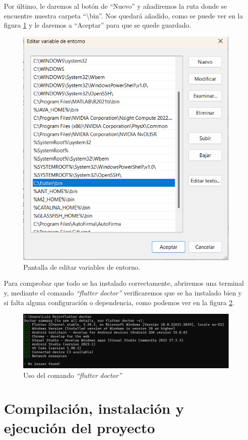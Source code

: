 Por último, le daremos al botón de ``Nuevo'' y añadiremos la ruta donde se encuentre nuestra carpeta ``\textbackslash bin''. Nos quedará añadido, como se puede ver en la figura \ref{C10} y le daremos a ``Aceptar'' para que se quede guardado.

\begin{figure}[H]
    \centering
    \includegraphics[width=0.8\linewidth]{Variables_Entorno_3.png}
    \caption{Pantalla de editar variables de entorno.}
    \label{C10}
\end{figure}

Para comprobar que todo se ha instalado correctamente, abriremos una terminal y, mediante el comando \textit{``flutter doctor''} verificaremos que se ha instalado bien y si falta alguna configuración o dependencia, como podemos ver en la figura \ref{C11}.

\begin{figure}[H]
    \centering
    \includegraphics[width=0.8\linewidth]{Comando_flutterdoctor.png}
    \caption{Uso del comando \textit{``flutter doctor''}}
    \label{C11}
\end{figure}

\section{Compilación, instalación y ejecución del proyecto}

